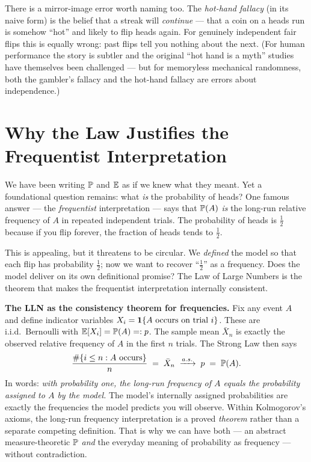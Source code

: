There is a mirror-image error worth naming too. The \emph{hot-hand fallacy} (in its naive form) is the belief that a streak will \emph{continue} --- that a coin on a heads run is somehow ``hot'' and likely to flip heads again. For genuinely independent fair flips this is equally wrong: past flips tell you nothing about the next. (For human performance the story is subtler and the original ``hot hand is a myth'' studies have themselves been challenged --- but for memoryless mechanical randomness, both the gambler's fallacy and the hot-hand fallacy are errors about independence.)

\section{Why the Law Justifies the Frequentist Interpretation}
\label{ch20:frequentist}

We have been writing $\P$ and $\E$ as if we knew what they meant. Yet a foundational question remains: what \emph{is} the probability of heads? One famous answer --- the \emph{frequentist} interpretation --- says that $\P(A)$ \emph{is} the long-run relative frequency of $A$ in repeated independent trials. The probability of heads is $\tfrac12$ because if you flip forever, the fraction of heads tends to $\tfrac12$.

This is appealing, but it threatens to be circular. We \emph{defined} the model so that each flip has probability $\tfrac12$; now we want to recover ``$\tfrac12$'' as a frequency. Does the model deliver on its own definitional promise? The Law of Large Numbers is the theorem that makes the frequentist interpretation internally consistent.

\begin{whybox}
\textbf{The LLN as the consistency theorem for frequencies.} Fix any event $A$ and define indicator variables $X_i = \ind\{A \text{ occurs on trial } i\}$. These are i.i.d.\ Bernoulli with $\E[X_i] = \P(A) =: p$. The sample mean $\bar X_n$ is exactly the observed relative frequency of $A$ in the first $n$ trials. The Strong Law then says
\[
  \frac{\#\{i \le n : A \text{ occurs}\}}{n} \;=\; \bar X_n \;\asto\; p \;=\; \P(A).
\]
In words: \emph{with probability one, the long-run frequency of $A$ equals the probability assigned to $A$ by the model.} The model's internally assigned probabilities are exactly the frequencies the model predicts you will observe. Within Kolmogorov's axioms, the long-run frequency interpretation is a proved \emph{theorem} rather than a separate competing definition. That is why we can have both --- an abstract measure-theoretic $\P$ \emph{and} the everyday meaning of probability as frequency --- without contradiction.
\end{whybox}

